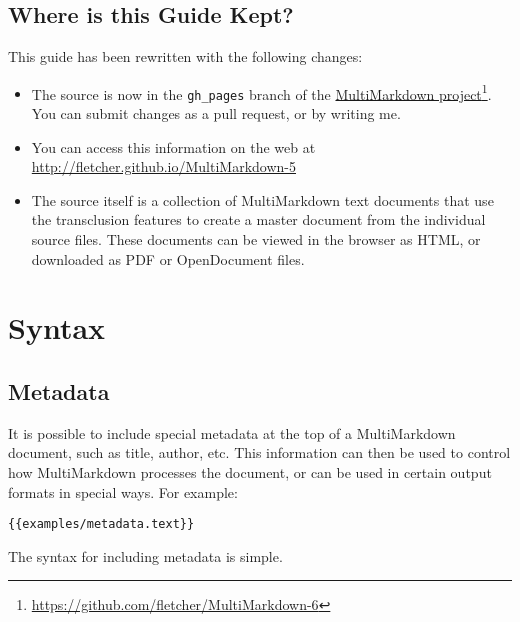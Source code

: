 \section{Where is this Guide Kept? }
\label{whereisthisguidekept}

This guide has been rewritten with the following changes:

\begin{itemize}
\item The source is now in the \texttt{gh\_pages} branch of the \href{https://github.com/fletcher/MultiMarkdown-6}{MultiMarkdown project}\footnote{\href{https://github.com/fletcher/MultiMarkdown-6}{https:\slash \slash github.com\slash fletcher\slash MultiMarkdown-6}}. You can submit changes as a pull request, or by writing me.

\item You can access this information on the web at \href{http://fletcher.github.io/MultiMarkdown-5}{http:\slash \slash fletcher.github.io\slash MultiMarkdown-5}

\item The source itself is a collection of MultiMarkdown text documents that use the transclusion features to create a master document from the individual source files. These documents can be viewed in the browser as HTML, or downloaded as PDF or OpenDocument files.

\end{itemize}

\chapter{Syntax }
\label{syntax}

\section{Metadata }
\label{metadata}

It is possible to include special metadata at the top of a MultiMarkdown
document, such as title, author, etc. This information can then be used to
control how MultiMarkdown processes the document, or can be used in certain
output formats in special ways. For example:

\begin{verbatim}
{{examples/metadata.text}}
\end{verbatim}

The syntax for including metadata is simple.

